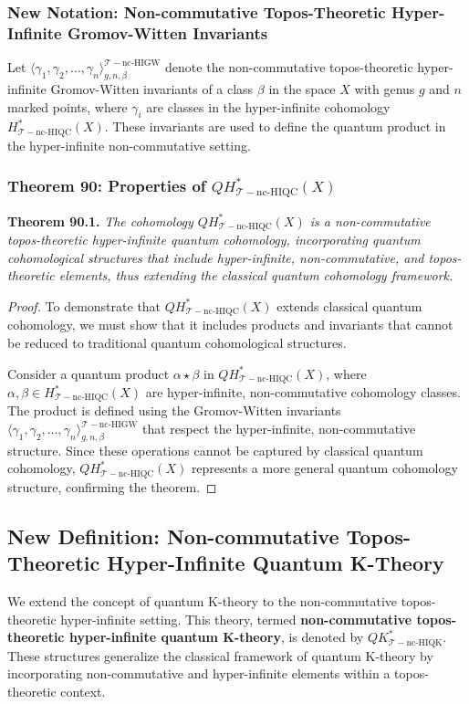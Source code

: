 \documentclass{article}
\begin{document}
\subsubsection{New Notation: Non-commutative Topos-Theoretic Hyper-Infinite Gromov-Witten Invariants}
Let \(\langle \gamma_1, \gamma_2, \dots, \gamma_n \rangle^{\mathcal{T}-\text{nc-HIGW}}_{g, n, \beta}\) denote the non-commutative topos-theoretic hyper-infinite Gromov-Witten invariants of a class \(\beta\) in the space \(X\) with genus \(g\) and \(n\) marked points, where \(\gamma_i\) are classes in the hyper-infinite cohomology \(H_{\mathcal{T}-\text{nc-HIQC}}^{*}(X)\). These invariants are used to define the quantum product in the hyper-infinite non-commutative setting.

\subsubsection{Theorem 90: Properties of \(QH_{\mathcal{T}-\text{nc-HIQC}}^{*}(X)\)}
\textbf{Theorem 90.1.} \textit{The cohomology \(QH_{\mathcal{T}-\text{nc-HIQC}}^{*}(X)\) is a non-commutative topos-theoretic hyper-infinite quantum cohomology, incorporating quantum cohomological structures that include hyper-infinite, non-commutative, and topos-theoretic elements, thus extending the classical quantum cohomology framework.}

\begin{proof}
To demonstrate that \(QH_{\mathcal{T}-\text{nc-HIQC}}^{*}(X)\) extends classical quantum cohomology, we must show that it includes products and invariants that cannot be reduced to traditional quantum cohomological structures.

Consider a quantum product \(\alpha \star \beta\) in \(QH_{\mathcal{T}-\text{nc-HIQC}}^{*}(X)\), where \(\alpha, \beta \in H_{\mathcal{T}-\text{nc-HIQC}}^{*}(X)\) are hyper-infinite, non-commutative cohomology classes. The product is defined using the Gromov-Witten invariants \(\langle \gamma_1, \gamma_2, \dots, \gamma_n \rangle^{\mathcal{T}-\text{nc-HIGW}}_{g, n, \beta}\) that respect the hyper-infinite, non-commutative structure. Since these operations cannot be captured by classical quantum cohomology, \(QH_{\mathcal{T}-\text{nc-HIQC}}^{*}(X)\) represents a more general quantum cohomology structure, confirming the theorem.
\end{proof}

\subsection{New Definition: Non-commutative Topos-Theoretic Hyper-Infinite Quantum K-Theory}
We extend the concept of quantum K-theory to the non-commutative topos-theoretic hyper-infinite setting. This theory, termed \textbf{non-commutative topos-theoretic hyper-infinite quantum K-theory}, is denoted by \(QK_{\mathcal{T}-\text{nc-HIQK}}^{*}\). These structures generalize the classical framework of quantum K-theory by incorporating non-commutative and hyper-infinite elements within a topos-theoretic context.
\end{document}
